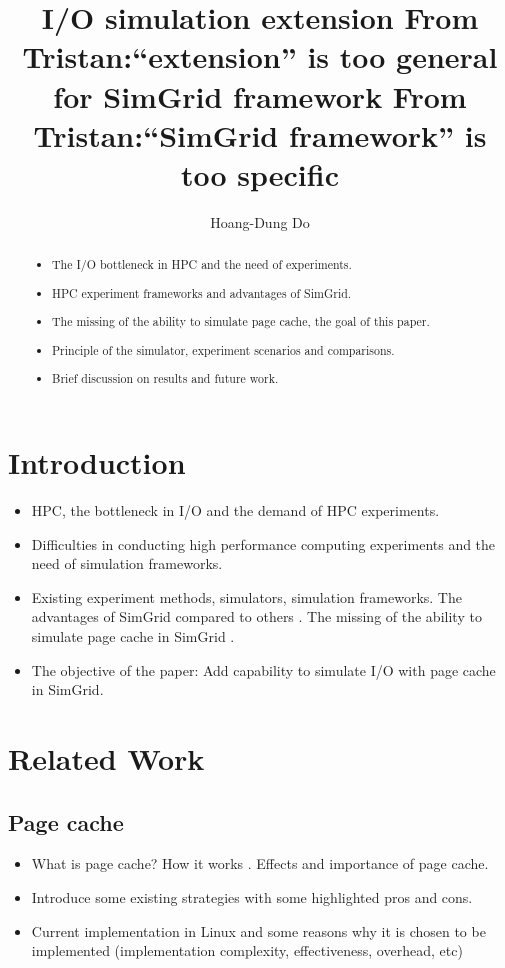 \documentclass[conference]{IEEEtran}
\newcommand{\tristan}[1]{\color{orange}\textbf{From Tristan:}#1\color{black}}
\begin{document}
\title{I/O simulation extension \tristan{``extension'' is too general} for SimGrid framework \tristan{``SimGrid framework'' is too specific}}
\author{Hoang-Dung Do}
\maketitle

	\begin{abstract}
		\begin{itemize}
			\item The I/O bottleneck in HPC and the need of experiments.
			\item HPC experiment frameworks and advantages of SimGrid.
			\item The missing of the ability to simulate page cache, the goal of this paper.
			\item Principle of the simulator, experiment scenarios and comparisons.
			\item Brief discussion on results and future work.
		\end{itemize}
	\end{abstract}

	\section{Introduction}
		\begin{itemize}
			\item HPC, the bottleneck in I/O and the demand of HPC experiments. 
			\item Difficulties in conducting high performance computing experiments and the need of simulation frameworks.
			\item Existing experiment methods, simulators, simulation frameworks. The advantages of SimGrid compared to others \cite{casanova2008, lebre2015}. The missing of the ability to simulate page cache in SimGrid \cite{lebre2015}.
			\item The objective of the paper: Add capability to simulate I/O with page cache in SimGrid.
		\end{itemize}
	\section{Related Work}			
		
		\subsection{Page cache}
			\begin{itemize}
				\item What is page cache? How it works \cite{linuxdev3rd2010}. Effects and importance of page cache.
				\item Introduce some existing strategies with some highlighted pros and cons.
				\item Current implementation in Linux and some reasons why it is chosen to be implemented (implementation complexity, effectiveness, overhead, etc) \cite{linuxdev3rd2010}
			\end{itemize}									
\end{document}
